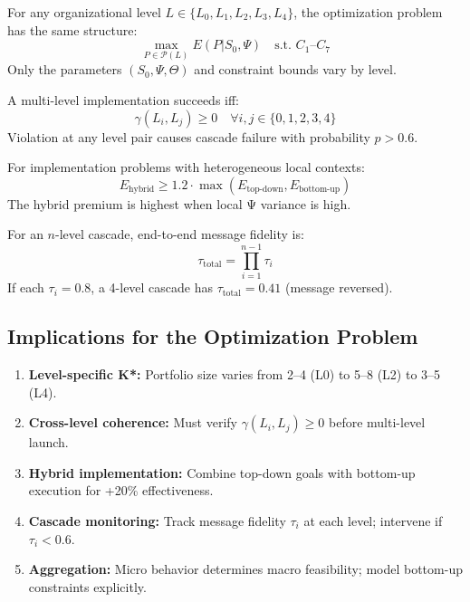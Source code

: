 \begin{theorem}
For any organizational level $L \in \{L_0, L_1, L_2, L_3, L_4\}$, the optimization problem has the same structure:
\begin{equation}
\max_{P \in \mathcal{P}(L)} E(P|S_0, \Psi) \quad \text{s.t. } C_1\text{--}C_7
\end{equation}
Only the parameters $(S_0, \Psi, \Theta)$ and constraint bounds vary by level.
\end{theorem}

\begin{theorem}
A multi-level implementation succeeds iff:
\begin{equation}
\gamma(L_i, L_j) \geq 0 \quad \forall i, j \in \{0, 1, 2, 3, 4\}
\end{equation}
Violation at any level pair causes cascade failure with probability $p > 0.6$.
\end{theorem}

\begin{theorem}
For implementation problems with heterogeneous local contexts:
\begin{equation}
E_{\text{hybrid}} \geq 1.2 \cdot \max(E_{\text{top-down}}, E_{\text{bottom-up}})
\end{equation}
The hybrid premium is highest when local Ψ variance is high.
\end{theorem}

\begin{theorem}
For an $n$-level cascade, end-to-end message fidelity is:
\begin{equation}
\tau_{\text{total}} = \prod_{i=1}^{n-1} \tau_i
\end{equation}
If each $\tau_i = 0.8$, a 4-level cascade has $\tau_{\text{total}} = 0.41$ (message reversed).
\end{theorem}

\subsection{Implications for the Optimization Problem}

\begin{enumerate}[nosep]
\item \textbf{Level-specific K*:} Portfolio size varies from 2--4 (L0) to 5--8 (L2) to 3--5 (L4).
\item \textbf{Cross-level coherence:} Must verify $\gamma(L_i, L_j) \geq 0$ before multi-level launch.
\item \textbf{Hybrid implementation:} Combine top-down goals with bottom-up execution for +20\% effectiveness.
\item \textbf{Cascade monitoring:} Track message fidelity $\tau_i$ at each level; intervene if $\tau_i < 0.6$.
\item \textbf{Aggregation:} Micro behavior determines macro feasibility; model bottom-up constraints explicitly.
\end{enumerate}

